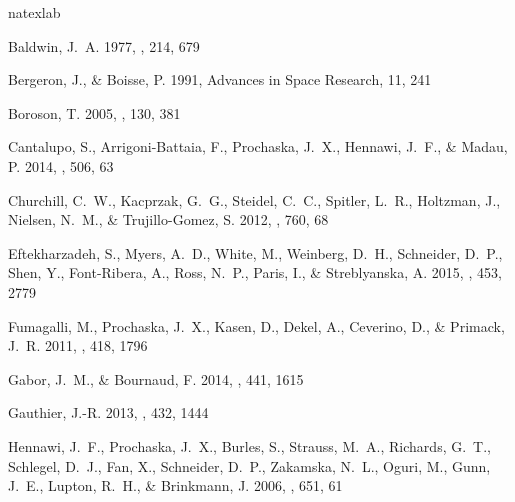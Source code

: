 \documentclass[iop]{emulateapj}
\begin{document}
%
%

\begin{thebibliography}{46}
\expandafter\ifx\csname natexlab\endcsname\relax\def\natexlab#1{#1}\fi

{Baldwin}, J.~A. 1977, \apj, 214, 679

{Bergeron}, J., \& {Boisse}, P. 1991, Advances in Space Research, 11, 241

{Boroson}, T. 2005, \aj, 130, 381

{Cantalupo}, S., {Arrigoni-Battaia}, F., {Prochaska}, J.~X., {Hennawi}, J.~F.,
  \& {Madau}, P. 2014, \nat, 506, 63

{Churchill}, C.~W., {Kacprzak}, G.~G., {Steidel}, C.~C., {Spitler}, L.~R.,
  {Holtzman}, J., {Nielsen}, N.~M., \& {Trujillo-Gomez}, S. 2012, \apj, 760, 68

{Eftekharzadeh}, S., {Myers}, A.~D., {White}, M., {Weinberg}, D.~H.,
  {Schneider}, D.~P., {Shen}, Y., {Font-Ribera}, A., {Ross}, N.~P., {Paris},
  I., \& {Streblyanska}, A. 2015, \mnras, 453, 2779

{Fumagalli}, M., {Prochaska}, J.~X., {Kasen}, D., {Dekel}, A., {Ceverino}, D.,
  \& {Primack}, J.~R. 2011, \mnras, 418, 1796

{Gabor}, J.~M., \& {Bournaud}, F. 2014, \mnras, 441, 1615

{Gauthier}, J.-R. 2013, \mnras, 432, 1444

{Hennawi}, J.~F., {Prochaska}, J.~X., {Burles}, S., {Strauss}, M.~A.,
  {Richards}, G.~T., {Schlegel}, D.~J., {Fan}, X., {Schneider}, D.~P.,
  {Zakamska}, N.~L., {Oguri}, M., {Gunn}, J.~E., {Lupton}, R.~H., \&
  {Brinkmann}, J. 2006, \apj, 651, 61


\end{thebibliography}
\end{document}
